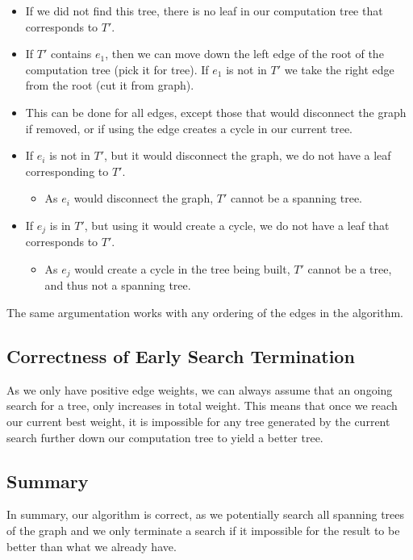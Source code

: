 \begin{itemize}
\item If we did not find this tree, there is no leaf in our computation tree that corresponds to $T'$.

\item If $T'$ contains $e_1$, then we can move down the left edge of the root of the computation tree (pick it for tree). If $e_1$ is not in $T'$ we take the right edge from the root (cut it from graph).

\item This can be done for all edges, except those that would disconnect the graph if removed, or if using the edge creates a cycle in our current tree.

\item If $e_i$ is not in $T'$, but it would disconnect the graph, we do not have a leaf corresponding to $T'$.
\begin{itemize}
\item As $e_i$ would disconnect the graph, $T'$ cannot be a spanning tree.
\end{itemize}

\item If $e_j$ is in $T'$, but using it would create a cycle, we do not have a leaf that corresponds to $T'$.

\begin{itemize}
\item As $e_j$ would create a cycle in the tree being built, $T'$ cannot be a tree, and thus not a spanning tree.
\end{itemize}
\end{itemize}

The same argumentation works with any ordering of the edges in the algorithm.

\subsection{Correctness of Early Search Termination}
As we only have positive edge weights, we can always assume that an ongoing search for a tree, only increases in total weight. This means that once we reach our current best weight, it is impossible for any tree generated by the current search further down our computation tree to yield a better tree.

\subsection{Summary}
In summary, our algorithm is correct, as we potentially search all spanning trees of the graph and we only terminate a search if it impossible for the result to be better than what we already have.

